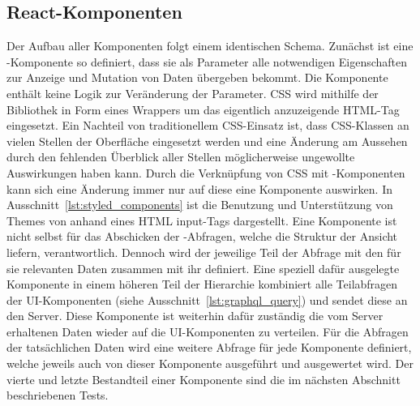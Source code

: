 \subsection{React-Komponenten}
Der Aufbau aller Komponenten folgt einem identischen Schema. Zunächst ist eine -Komponente so definiert, dass sie als Parameter alle notwendigen Eigenschaften zur Anzeige und Mutation von Daten übergeben bekommt. Die Komponente enthält keine Logik zur Veränderung der Parameter.
CSS wird mithilfe der Bibliothek  in Form eines Wrappers um das eigentlich anzuzeigende HTML-Tag eingesetzt. Ein Nachteil von traditionellem CSS-Einsatz ist, dass CSS-Klassen an vielen Stellen der Oberfläche eingesetzt werden und eine Änderung am Aussehen durch den fehlenden Überblick aller Stellen möglicherweise ungewollte Auswirkungen haben kann. Durch die Verknüpfung von CSS mit -Komponenten kann sich eine Änderung immer nur auf diese eine Komponente auswirken. In Ausschnitt~\ref{lst:styled_components} ist die Benutzung und Unterstützung von Themes von  anhand eines HTML input-Tags dargestellt.
Eine Komponente ist nicht selbst für das Abschicken der -Abfragen, welche die Struktur der Ansicht liefern, verantwortlich. Dennoch wird der jeweilige Teil der Abfrage mit den für sie relevanten Daten zusammen mit ihr definiert. Eine speziell dafür ausgelegte Komponente in einem höheren Teil der Hierarchie kombiniert alle Teilabfragen der UI-Komponenten (siehe Ausschnitt~\ref{lst:graphql_query}) und sendet diese an den Server. Diese Komponente ist weiterhin dafür zuständig die vom Server erhaltenen Daten wieder auf die UI-Komponenten zu verteilen. Für die Abfragen der tatsächlichen Daten wird eine weitere Abfrage für jede Komponente definiert, welche jeweils auch von dieser Komponente ausgeführt und ausgewertet wird.
Der vierte und letzte Bestandteil einer Komponente sind die im nächsten Abschnitt beschriebenen Tests.






